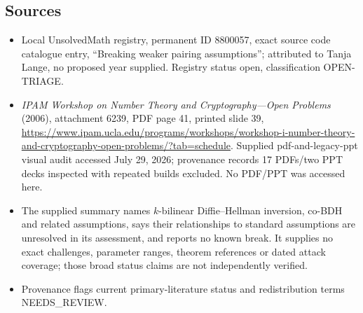 \documentclass[11pt]{article}
\begin{document}
\subsection{Sources}
\begin{itemize}
\item Local UnsolvedMath registry, permanent ID 8800057, exact source code catalogue entry, ``Breaking weaker pairing assumptions''; attributed to Tanja Lange, no proposed year supplied. Registry status open, classification OPEN-TRIAGE.
\item \emph{IPAM Workshop on Number Theory and Cryptography---Open Problems} (2006), attachment 6239, PDF page 41, printed slide 39, \url{https://www.ipam.ucla.edu/programs/workshops/workshop-i-number-theory-and-cryptography-open-problems/?tab=schedule}. Supplied pdf-and-legacy-ppt visual audit accessed July 29, 2026; provenance records 17 PDFs/two PPT decks inspected with repeated builds excluded. No PDF/PPT was accessed here.
\item The supplied summary names $k$-bilinear Diffie--Hellman inversion, co-BDH and related assumptions, says their relationships to standard assumptions are unresolved in its assessment, and reports no known break. It supplies no exact challenges, parameter ranges, theorem references or dated attack coverage; those broad status claims are not independently verified.
\item Provenance flags current primary-literature status and redistribution terms NEEDS\_REVIEW.
\end{itemize}
\end{document}
